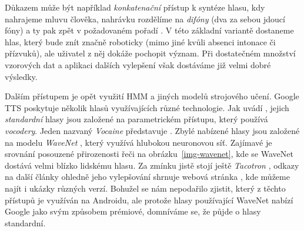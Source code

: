 Důkazem může být například
\textit{konkatenační} přístup k syntéze hlasu, kdy nahrajeme mluvu člověka,
nahrávku rozdělíme na \textit{difóny} (dva za sebou jdoucí fóny) a ty pak
zpět  v požadovaném pořadí \citep{OSHAUGHNESSY198855}. V této základní variantě dostaneme
hlas, který bude znít značně roboticky (mimo jiné kvůli absenci intonace či
přízvuků), ale uživatel z něj dokáže pochopit význam. Při dostatečném množství
vzorových dat a aplikaci dalších vylepšení však dostáváme již velmi dobré
výsledky.

Dalším přístupem je opět využití HMM a jiných modelů strojového učení.
Google TTS poskytuje několik hlasů využívajících různé technologie. Jak uvádí \citep{google_tts},
jejich \textit{standardní} hlasy jsou založené na parametrickém přístupu,
který používá \textit{vocodery}. Jeden
nazvaný \textit{Vocaine} představuje \citet{vocaine_2015}. Zbylé nabízené
hlasy jsou založené na modelu \textit{WaveNet} \citep{oord_wavenet_2016},
který využívá hlubokou neuronovou síť. Zajímavé je srovnání posouzené
přirozenosti řeči na obrázku~\ref{img-wavenet}, kde se WaveNet dostává velmi blízko
lidskému hlasu. Za zmínku jistě stojí ještě \textit{Tacotron} \citep{wang2017tacotron},
odkazy na další články ohledně jeho vylepšování shrnuje webová
stránka \citep{google_github_tacotron}, kde můžeme najít i ukázky různých verzí.
Bohužel se nám nepodařilo zjistit, který z těchto přístupů je využíván
na Androidu, ale protože hlasy používající WaveNet nabízí Google jako svým
způsobem prémiové, domníváme se, že půjde o hlasy standardní.

